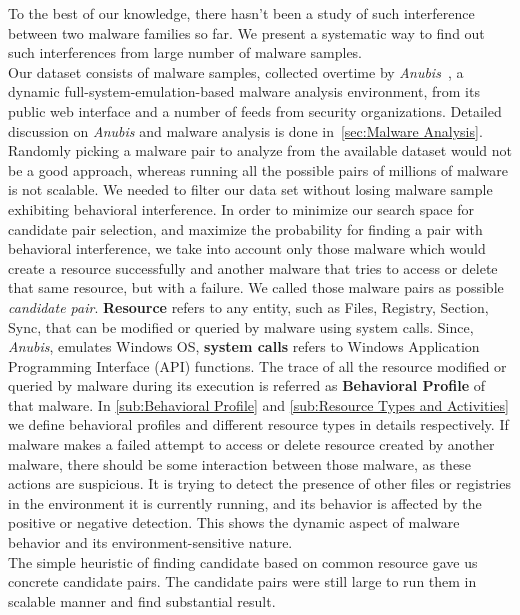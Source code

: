 To the best of our knowledge, there hasn't been a study of such interference between two malware families so far.
We present a systematic way to find out such interferences from large number of malware samples.\\
Our dataset consists of {\gettotalmalwarei{}} malware samples, collected overtime by \emph{Anubis}~\cite[]{anubis}, a dynamic full-system-emulation-based malware analysis environment, from its public web interface and a number of feeds from security organizations.
Detailed discussion on \emph{Anubis} and malware analysis is done in~\autoref{sec:Malware Analysis}.
Randomly picking a malware pair to analyze from the available dataset would not be a good approach, whereas running all the possible pairs of millions of malware is not scalable.
We needed to filter our data set without losing malware sample exhibiting behavioral interference.
In order to minimize our search space for candidate pair selection, and maximize the probability for finding a pair with behavioral interference, we take into account only those malware which would create a resource successfully and another malware that tries to access or delete that same resource, but with a failure.
We called those malware pairs as possible \emph{candidate pair}.
\textbf{Resource} refers to any entity, such as Files, Registry, Section, Sync, that can be modified or queried by malware using system calls.
Since, \emph{Anubis}, emulates Windows OS, \textbf{system calls} refers to Windows Application Programming Interface (API) functions.
The trace of all the resource modified or queried by malware during its execution is referred as \textbf{Behavioral Profile} of that malware.
In \autoref{sub:Behavioral Profile} and \autoref{sub:Resource Types and Activities} we define behavioral profiles and different resource types in details respectively.
If malware makes a failed attempt to access or delete resource created by another malware, there should be some interaction between those malware, as these actions are suspicious.
It is trying to detect the presence of other files or registries in the environment it is currently running, and its behavior is affected by the positive or negative detection.
This shows the dynamic aspect of malware behavior and its environment-sensitive nature.\\
The simple heuristic of finding candidate based on common resource gave us concrete candidate pairs.
The candidate pairs were still large to run them in scalable manner and find substantial result.
